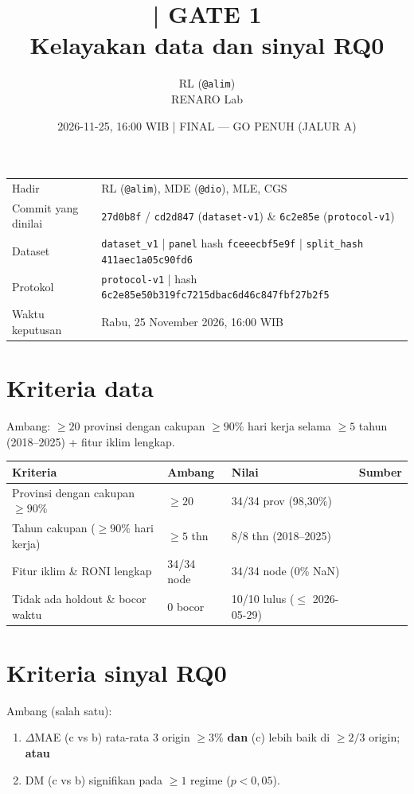\documentclass[11pt,a4paper]{article}
\title{\jobid{RL-H3-02} | GATE 1\\
\large Kelayakan data dan sinyal RQ0}
\author{RL (\texttt{@alim}) \\ \small RENARO Lab}
\date{2026-11-25, 16:00 WIB \quad | \quad \textcolor{green!50!black}{FINAL — GO PENUH (JALUR A)}}
\begin{document}
\maketitle

\begin{table}[H]
\centering
\small
\begin{tabular}{@{}L{3.6cm}L{10.4cm}@{}}
\toprule
Hadir & RL (\texttt{@alim}), MDE (\texttt{@dio}), MLE, CGS \\
Commit yang dinilai & \texttt{27d0b8f} / \texttt{cd2d847} (\texttt{dataset-v1}) \& \texttt{6c2e85e} (\texttt{protocol-v1}) \\
Dataset & \texttt{dataset\_v1} | \texttt{panel} hash \texttt{fceeecbf5e9f} | \texttt{split\_hash} \texttt{411aec1a05c90fd6} \\
Protokol & \texttt{protocol-v1} | hash \texttt{6c2e85e50b319fc7215dbac6d46c847fbf27b2f5} \\
Waktu keputusan & Rabu, 25 November 2026, 16:00 WIB \\
\bottomrule
\end{tabular}
\end{table}

\section{Kriteria data}
Ambang: $\ge 20$ provinsi dengan cakupan $\ge 90\%$ hari kerja selama $\ge 5$ tahun
(2018--2025) + fitur iklim lengkap.

\begin{table}[H]
\centering
\small
\begin{tabular}{@{}L{5.0cm}C{2.0cm}C{2.6cm}L{4.2cm}@{}}
\toprule
Kriteria & Ambang & Nilai & Sumber \\
\midrule
Provinsi dengan cakupan $\ge 90\%$ & $\ge 20$ & 34/34 prov (98,30\%) &  \\
Tahun cakupan ($\ge 90\%$ hari kerja) & $\ge 5$ thn & 8/8 thn (2018--2025) &  \\
Fitur iklim \& RONI lengkap & 34/34 node & 34/34 node (0\% NaN) &  \\
Tidak ada holdout \& bocor waktu & 0 bocor & 10/10 lulus ($\le$ 2026-05-29) &  \\
\bottomrule
\end{tabular}
\end{table}

\section{Kriteria sinyal RQ0}
Ambang (salah satu):
\begin{enumerate}
  \item $\Delta$MAE (c vs b) rata-rata 3 origin $\ge 3\%$ \textbf{dan}
        (c) lebih baik di $\ge 2/3$ origin; \textbf{atau}
  \item DM (c vs b) signifikan pada $\ge 1$ regime ($p<0{,}05$).
\end{enumerate}
\end{document}
